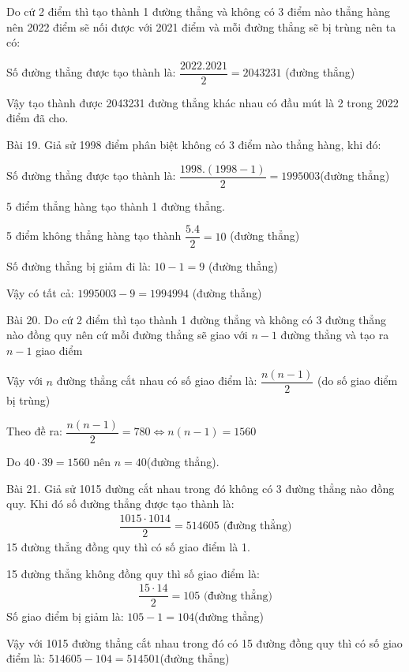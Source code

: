 \begin{Answer}{11}
		Do cứ 2 điểm thì tạo thành 1 đường thẳng và không có 3 điểm nào thẳng hàng nên 2022 điểm sẽ nối được với 2021 điểm và mỗi đường thẳng sẽ bị trùng nên ta có:
		
		Số đường thẳng được tạo thành là: $\dfrac{2022.2021}{2}=2043231$ (đường thẳng)
		
		Vậy tạo thành được 2043231 đường thẳng khác nhau có đầu mút là 2 trong 2022 điểm đã cho.
	
\end{Answer}
\begin{Answer}{12}
		Bài 19. Giả sử 1998 điểm phân biệt không có 3 điểm nào thẳng hàng, khi đó:
		
		Số đường thẳng được tạo thành là: $\dfrac{1998.(1998-1)}{2}=1995003$(đường thẳng)
		
		5 điểm thẳng hàng tạo thành 1 đường thẳng.
		
		5 điểm không thẳng hàng tạo thành $\dfrac{5.4}{2}=10$ (đường thẳng)
		
		Số đường thẳng bị giảm đi là: $10-1=9$ (đường thẳng)
		
		Vậy có tất cả: $1995003-9=1994994$ (đường thẳng)
	
\end{Answer}
\begin{Answer}{13}
		Bài 20. Do cứ 2 điểm thì tạo thành 1 đường thẳng và không có 3 đường thẳng nào đồng quy nên cứ mỗi đường thẳng sẽ giao với $n-1$ đường thẳng và tạo ra $n-1$ giao điểm
		
		Vậy với $n$ đường thẳng cắt nhau có số giao điểm là: $\dfrac{n(n-1)}{2}$ (do số giao điểm bị trùng)
		
		Theo đề ra: $\dfrac{n(n-1)}{2}=780 \Leftrightarrow n(n-1)=1560$
		
		Do $40\cdot39=1560$ nên $n=40$(đường thẳng).
	
\end{Answer}
\begin{Answer}{14}
		Bài 21. Giả sử 1015 đường cắt nhau trong đó không có 3 đường thẳng nào đồng quy. Khi đó số đường thẳng được tạo thành là:
		\begin{align*}
			\dfrac{1015\cdot1014}{2}=514605 \text{ (đường thẳng)}
		\end{align*}
		15 đường thẳng đồng quy thì có số giao điểm là 1.
		
		15 đường thẳng không đồng quy thì số giao điểm là:
		\begin{align*}
			\dfrac{15\cdot14}{2}=105 \text{ (đường thẳng)}
		\end{align*}
		Số giao điểm bị giảm là: $105-1=104$(đường thẳng)
		
		Vậy với 1015 đường thẳng cắt nhau trong đó có 15 đường đồng quy thì có số giao điểm là: $514605-104=514501$(đường thẳng)
	
\end{Answer}
